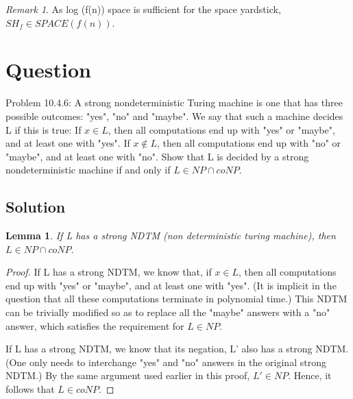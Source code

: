 \documentclass[10pt]{amsart}
\newtheorem{lem}[thm]{Lemma}
\theoremstyle{remark}
\newtheorem{rem}[thm]{Remark}
\begin{document}
\begin{rem}
As log (f(n)) space is sufficient for the space yardstick, $SH_{f} \in SPACE(f(n))$.
\end{rem}

\section{Question}
Problem 10.4.6: A strong nondeterministic Turing machine is one that has three possible outcomes: "yes", "no" and "maybe". We say that such a machine decides L if this is true: If $x \in L$, then all computations end up with "yes" or "maybe", and at least one with "yes". If $x \notin L$, then all computations end up with "no" or "maybe", and at least one with "no". Show that L is decided by a strong nondeterministic machine if and only if $L \in NP \cap coNP$.

\subsection{Solution}

\begin{lem}
If L has a strong NDTM (non deterministic turing machine), then $L \in NP \cap coNP$.
\end{lem}
\begin{proof}
If L has a strong NDTM, we know that, if $x \in L$, then all computations end up with "yes" or "maybe", and at least one with "yes". (It is implicit in the question that all these computations terminate in polynomial time.) This NDTM can be trivially modified so as to replace all the "maybe" answers with a "no" answer, which satisfies the requirement for $L \in NP $.

If L has a strong NDTM, we know that its negation, L' also has a strong NDTM. (One only needs to interchange "yes" and "no" answers in the original strong NDTM.) By the same argument used earlier in this proof, $L'\in NP $. Hence, it follows that $L \in coNP$.
\end{proof}
\end{document}
